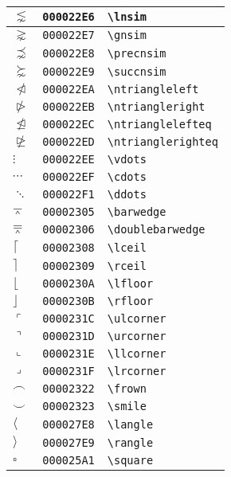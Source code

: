 \begin{longtable}{|l|l|l|}
$\lnsim$ & \texttt{000022E6} & \verb|\lnsim| \\
\hline
$\gnsim$ & \texttt{000022E7} & \verb|\gnsim| \\
\hline
$\precnsim$ & \texttt{000022E8} & \verb|\precnsim| \\
\hline
$\succnsim$ & \texttt{000022E9} & \verb|\succnsim| \\
\hline
$\ntriangleleft$ & \texttt{000022EA} & \verb|\ntriangleleft| \\
\hline
$\ntriangleright$ & \texttt{000022EB} & \verb|\ntriangleright| \\
\hline
$\ntrianglelefteq$ & \texttt{000022EC} & \verb|\ntrianglelefteq| \\
\hline
$\ntrianglerighteq$ & \texttt{000022ED} & \verb|\ntrianglerighteq| \\
\hline
$\vdots$ & \texttt{000022EE} & \verb|\vdots| \\
\hline
$\cdots$ & \texttt{000022EF} & \verb|\cdots| \\
\hline
$\ddots$ & \texttt{000022F1} & \verb|\ddots| \\
\hline
$\barwedge$ & \texttt{00002305} & \verb|\barwedge| \\
\hline
$\doublebarwedge$ & \texttt{00002306} & \verb|\doublebarwedge| \\
\hline
$\lceil$ & \texttt{00002308} & \verb|\lceil| \\
\hline
$\rceil$ & \texttt{00002309} & \verb|\rceil| \\
\hline
$\lfloor$ & \texttt{0000230A} & \verb|\lfloor| \\
\hline
$\rfloor$ & \texttt{0000230B} & \verb|\rfloor| \\
\hline
$\ulcorner$ & \texttt{0000231C} & \verb|\ulcorner| \\
\hline
$\urcorner$ & \texttt{0000231D} & \verb|\urcorner| \\
\hline
$\llcorner$ & \texttt{0000231E} & \verb|\llcorner| \\
\hline
$\lrcorner$ & \texttt{0000231F} & \verb|\lrcorner| \\
\hline
$\frown$ & \texttt{00002322} & \verb|\frown| \\
\hline
$\smile$ & \texttt{00002323} & \verb|\smile| \\
\hline
$\langle$ & \texttt{000027E8} & \verb|\langle| \\
\hline
$\rangle$ & \texttt{000027E9} & \verb|\rangle| \\
\hline
$\square$ & \texttt{000025A1} & \verb|\square| \\

\end{longtable}
